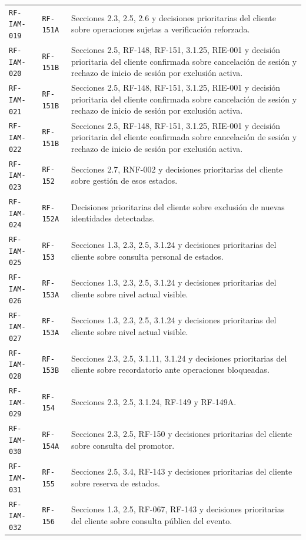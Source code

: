 \documentclass[10pt,letterpaper]{article}
\begin{document}
\begin{landscape}
\begin{longtable}{P{2.7cm}P{2.6cm}P{15.7cm}}
\texttt{RF-IAM-019} & \texttt{RF-151A} & Secciones 2.3, 2.5, 2.6 y decisiones prioritarias del cliente sobre operaciones sujetas a verificación reforzada.\\
\texttt{RF-IAM-020} & \texttt{RF-151B} & Secciones 2.5, RF-148, RF-151, 3.1.25, RIE-001 y decisión prioritaria del cliente confirmada sobre cancelación de sesión y rechazo de inicio de sesión por exclusión activa.\\
\texttt{RF-IAM-021} & \texttt{RF-151B} & Secciones 2.5, RF-148, RF-151, 3.1.25, RIE-001 y decisión prioritaria del cliente confirmada sobre cancelación de sesión y rechazo de inicio de sesión por exclusión activa.\\
\texttt{RF-IAM-022} & \texttt{RF-151B} & Secciones 2.5, RF-148, RF-151, 3.1.25, RIE-001 y decisión prioritaria del cliente confirmada sobre cancelación de sesión y rechazo de inicio de sesión por exclusión activa.\\
\texttt{RF-IAM-023} & \texttt{RF-152} & Secciones 2.7, RNF-002 y decisiones prioritarias del cliente sobre gestión de esos estados.\\
\texttt{RF-IAM-024} & \texttt{RF-152A} & Decisiones prioritarias del cliente sobre exclusión de nuevas identidades detectadas.\\
\texttt{RF-IAM-025} & \texttt{RF-153} & Secciones 1.3, 2.3, 2.5, 3.1.24 y decisiones prioritarias del cliente sobre consulta personal de estados.\\
\texttt{RF-IAM-026} & \texttt{RF-153A} & Secciones 1.3, 2.3, 2.5, 3.1.24 y decisiones prioritarias del cliente sobre nivel actual visible.\\
\texttt{RF-IAM-027} & \texttt{RF-153A} & Secciones 1.3, 2.3, 2.5, 3.1.24 y decisiones prioritarias del cliente sobre nivel actual visible.\\
\texttt{RF-IAM-028} & \texttt{RF-153B} & Secciones 2.3, 2.5, 3.1.11, 3.1.24 y decisiones prioritarias del cliente sobre recordatorio ante operaciones bloqueadas.\\
\texttt{RF-IAM-029} & \texttt{RF-154} & Secciones 2.3, 2.5, 3.1.24, RF-149 y RF-149A.\\
\texttt{RF-IAM-030} & \texttt{RF-154A} & Secciones 2.3, 2.5, RF-150 y decisiones prioritarias del cliente sobre consulta del promotor.\\
\texttt{RF-IAM-031} & \texttt{RF-155} & Secciones 2.5, 3.4, RF-143 y decisiones prioritarias del cliente sobre reserva de estados.\\
\texttt{RF-IAM-032} & \texttt{RF-156} & Secciones 1.3, 2.5, RF-067, RF-143 y decisiones prioritarias del cliente sobre consulta pública del evento.\\

\end{longtable}
\end{landscape}
\end{document}
